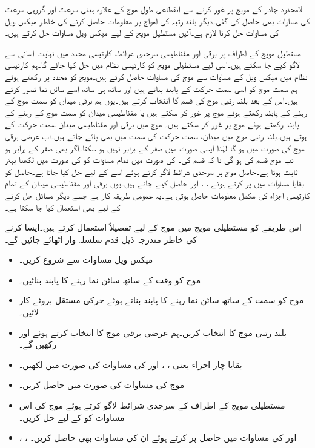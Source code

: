 لامحدود چادر کے مویج پر غور کرنے سے انقطاعی طول موج کے علاوہ ہیتی سرعت اور گروہی سرعت کی مساوات بھی حاصل کی  گئی۔دیگر بلند رتبہ کی امواج پر معلومات حاصل کرنے کی خاطر میکس ویل کی مساوات حل کرنا لازم ہے۔آئیں  مستطیل مویج کے لیے میکس ویل مساوات حل کرتے ہیں۔

مستطیل مویج کے اطراف پر برقی اور مقناطیسی سرحدی شرائط، کارتیسی محدد میں نہایت آسانی سے لاگو کیے جا سکتے ہیں۔اسی لیے مستطیلی مویج کو کارتیسی نظام میں حل کیا جائے گا۔ہم کارتیسی نظام میں میکس ویل کے مساوات سے  موج کی مساوات حاصل کرتے ہیں۔مویج کو  محدد پر رکھتے ہوئے ہم سمت موج کو اسی سمت حرکت کے پابند بناتے ہیں اور ساتھ ہی ساتھ اسے سائن نما تصور کرتے ہیں۔اس کے بعد بلند رتبی موج کی قسم کا انتخاب کرتے ہیں۔یوں ہم برقی میدان  کو سمت موج کے  رہنے کے پابند رکھتے ہوئے   موج پر غور کر سکتے ہیں یا مقناطیسی میدان کو سمت موج کے  رہنے کے پابند رکھتے ہوئے   موج پر غور کر سکتے ہیں۔ موج میں برقی اور مقناطیسی میدان سمت حرکت کے  ہوتے ہیں۔بلند رتبی موج میں میدان، سمت حرکت کی سمت میں بھی پائے جاتے ہیں۔اب عرضی برقی  موج کی صورت میں  ہو گا لہٰذا ایسی صورت میں  صفر کے برابر نہیں ہو سکتا۔اگر  بھی صفر کے برابر ہو تب موج  قسم کی ہو گی نا کہ  قسم کی۔ کی صورت میں تمام مساوات کو  کی صورت میں لکھنا بہتر ثابت ہوتا ہے۔حاصل موج پر سرحدی شرائط لاگو کرتے ہوئے اسے  کے لیے حل کیا جاتا ہے۔حاصل  کو بقایا مساوات میں پر کرتے ہوئے ، ،  اور  حاصل کیے جاتے ہیں۔یوں برقی اور مقناطیسی میدان کے تمام کارتیسی اجزاء کی مکمل معلومات حاصل ہوتی ہے۔یہ عمومی طریقہ کار ہے جسے دیگر مسائل حل کرنے کے لیے بھی استعمال کیا جا سکتا ہے۔

اس طریقے کو مستطیلی مویج میں  موج کے لیے تفصیلاً  استعمال کرتے ہیں۔ایسا کرنے کی خاطر مندرجہ ذیل قدم سلسلہ وار اٹھائے جائیں گے۔
\begin{itemize}\label{اقدام_مویج_آٹھ_قدم}
\item
میکس ویل مساوات سے شروع کریں۔
\item
موج کو وقت کے ساتھ سائن نما رہنے کا پابند بنائیں۔
\item
موج کو  سمت کے ساتھ سائن نما رہنے کا پابند بناتے ہوئے  حرکی مستقل بروئے کار لائیں۔
\item
بلند رتبی موج کا انتخاب کریں۔ہم  عرضی برقی  موج کا انتخاب کرتے ہوئے  اور  رکھیں گے۔
\item
بقایا چار اجزاء یعنی ، ،  اور  کی مساوات  کی صورت میں لکھیں۔
\item
موج کی مساوات  کی صورت میں حاصل کریں۔
\item
مستطیلی مویج کے اطراف کے سرحدی شرائط لاگو کرتے ہوئے موج کی اس مساوات کو  کے لیے حل کریں۔
\item
{}، ،  اور  کی مساوات میں حاصل  پر کرتے ہوئے ان کی مساوات بھی حاصل کریں۔
\end{itemize}  

